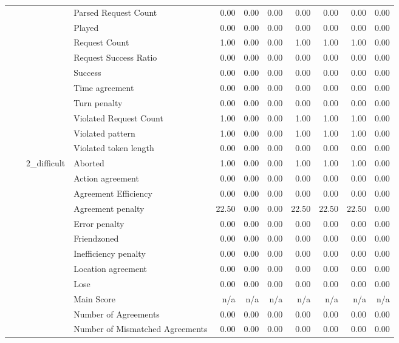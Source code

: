 \begin{tabular}{llllrrrrrrr}
 &  &  & Parsed Request Count & 0.00 & 0.00 & 0.00 & 0.00 & 0.00 & 0.00 & 0.00 \\
 &  &  & Played & 0.00 & 0.00 & 0.00 & 0.00 & 0.00 & 0.00 & 0.00 \\
 &  &  & Request Count & 1.00 & 0.00 & 0.00 & 1.00 & 1.00 & 1.00 & 0.00 \\
 &  &  & Request Success Ratio & 0.00 & 0.00 & 0.00 & 0.00 & 0.00 & 0.00 & 0.00 \\
 &  &  & Success & 0.00 & 0.00 & 0.00 & 0.00 & 0.00 & 0.00 & 0.00 \\
 &  &  & Time agreement & 0.00 & 0.00 & 0.00 & 0.00 & 0.00 & 0.00 & 0.00 \\
 &  &  & Turn penalty & 0.00 & 0.00 & 0.00 & 0.00 & 0.00 & 0.00 & 0.00 \\
 &  &  & Violated Request Count & 1.00 & 0.00 & 0.00 & 1.00 & 1.00 & 1.00 & 0.00 \\
 &  &  & Violated pattern & 1.00 & 0.00 & 0.00 & 1.00 & 1.00 & 1.00 & 0.00 \\
 &  &  & Violated token length & 0.00 & 0.00 & 0.00 & 0.00 & 0.00 & 0.00 & 0.00 \\
\cline{3-11}
 &  & \multirow[t]{27}{*}{2_difficult} & Aborted & 1.00 & 0.00 & 0.00 & 1.00 & 1.00 & 1.00 & 0.00 \\
 &  &  & Action agreement & 0.00 & 0.00 & 0.00 & 0.00 & 0.00 & 0.00 & 0.00 \\
 &  &  & Agreement Efficiency & 0.00 & 0.00 & 0.00 & 0.00 & 0.00 & 0.00 & 0.00 \\
 &  &  & Agreement penalty & 22.50 & 0.00 & 0.00 & 22.50 & 22.50 & 22.50 & 0.00 \\
 &  &  & Error penalty & 0.00 & 0.00 & 0.00 & 0.00 & 0.00 & 0.00 & 0.00 \\
 &  &  & Friendzoned & 0.00 & 0.00 & 0.00 & 0.00 & 0.00 & 0.00 & 0.00 \\
 &  &  & Inefficiency penalty & 0.00 & 0.00 & 0.00 & 0.00 & 0.00 & 0.00 & 0.00 \\
 &  &  & Location agreement & 0.00 & 0.00 & 0.00 & 0.00 & 0.00 & 0.00 & 0.00 \\
 &  &  & Lose & 0.00 & 0.00 & 0.00 & 0.00 & 0.00 & 0.00 & 0.00 \\
 &  &  & Main Score & n/a & n/a & n/a & n/a & n/a & n/a & n/a \\
 &  &  & Number of Agreements & 0.00 & 0.00 & 0.00 & 0.00 & 0.00 & 0.00 & 0.00 \\
 &  &  & Number of Mismatched Agreements & 0.00 & 0.00 & 0.00 & 0.00 & 0.00 & 0.00 & 0.00 \\

\end{tabular}

